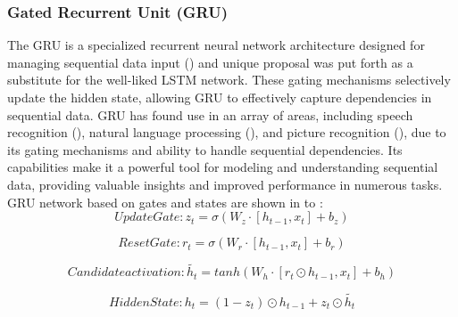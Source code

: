 \documentclass[a4paper, fleqn]{cas-sc}
\theoremstyle{definition}
\theoremstyle{remark}
\begin{document}
\subsubsection{Gated Recurrent Unit (GRU)}
The GRU is a specialized recurrent neural network architecture designed for managing sequential data input  (\cite{chung2014empirical}) and unique proposal was put forth as a substitute for the well-liked LSTM network. These gating mechanisms selectively update the hidden state,  allowing GRU to effectively capture dependencies in sequential data. GRU has found use in an array of areas,  including speech recognition (\cite{shewalkar2019performance, yuan2018auxiliary}),  natural language processing (\cite{cascianelli2018full, wang2020feature}),  and picture recognition (\cite{subramanian2022integrated}),  due to its gating mechanisms and ability to handle sequential dependencies. Its capabilities make it a powerful tool for modeling and understanding sequential data,  providing valuable insights and improved performance in numerous tasks. GRU network based on gates and states are shown in  to : \\

 
\begin{equation} \label{up Gru}
  Update Gate :  z_t= \sigma(W_{z}\cdot \left[ h_{t-1}, x_t \right]+b_z )
\end{equation}

\begin{equation}\label{r gru}
  Reset Gate :  r_t=\sigma (W_{r}\cdot \left[ h_{t-1}, x_t \right]+b_r )
\end{equation}

\begin{equation} \label{can gru}
  Candidate activation :  \tilde{h_t}=tanh(W_h \cdot \left[ r_t \odot h_{t-1}, x_t \right]+b_h)
\end{equation}

\begin{equation} \label{hid gru}
  Hidden State :   h_t=(1-z_t) \odot h_{t-1}+z_t \odot \tilde{h_t}
\end{equation}
\end{document}
